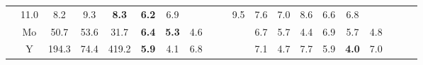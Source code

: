 \documentclass[french,10pt]{article}
\begin{document}
\begin{landscape}
\begin{longtable}{ l  c | c c c | c c c | c c c | c c c | c c c | c c c | }
                    &                     11.0
     & {\footnotesize     8.2
    } & {\footnotesize     9.3
     }
    
    
                    &                     \textbf{ 8.3}
     & {\footnotesize     \textbf{ 6.2}
    } & {\footnotesize     6.9
     }
    
    
                    & & &

                    &                     9.5
     & {\footnotesize     7.6
    } & {\footnotesize     7.0
     }
    
    
                    &                     8.6
     & {\footnotesize     6.6
    } & {\footnotesize     6.8
     }
    
    
                    & & &

                    \\*
                        & {\small Mo  }

                    &                     50.7
     & {\footnotesize     53.6
    } & {\footnotesize     31.7
     }
    
    
                    &                     \textbf{ 6.4}
     & {\footnotesize     \textbf{ 5.3}
    } & {\footnotesize     4.6
     }
    
    
                    & & &

                    &                     6.7
     & {\footnotesize     5.7
    } & {\footnotesize     4.4
     }
    
    
                    &                     6.9
     & {\footnotesize     5.7
    } & {\footnotesize     4.8
     }
    
    
                    & & &

                    \\*
                        & {\small Y  }

                    &                     194.3
     & {\footnotesize     74.4
    } & {\footnotesize     419.2
     }
    
    
                    &                     \textbf{ 5.9}
     & {\footnotesize     4.1
    } & {\footnotesize     6.8
     }
    
    
                    & & &

                    &                     7.1
     & {\footnotesize     4.7
    } & {\footnotesize     7.7
     }
    
    
                    &                     5.9
     & {\footnotesize     \textbf{ 4.0}
    } & {\footnotesize     7.0
     }
    

\end{longtable}
\end{landscape}
\end{document}
